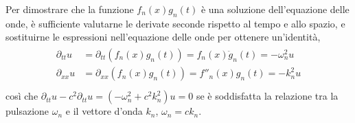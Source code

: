 \documentclass[letterpaper,10pt,italian]{jupyterBook}
\begin{document}
\sphinxAtStartPar
Per dimostrare che la funzione \(f_n(x) g_n(t)\) è una soluzione dell’equazione delle onde, è sufficiente valutarne le derivate seconde rispetto al tempo e allo spazio, e sostituirne le espressioni nell’equazione delle onde per ottenere un’identità,
\begin{equation*}
\begin{split}\begin{aligned}
  \partial_{tt} u & = \partial_{tt} \left( f_n(x) g_n(t) \right) = f_n(x) \ddot{g}_n(t) = - \omega_n^2 u \\
  \partial_{xx} u & = \partial_{xx} \left( f_n(x) g_n(t) \right) = f''_n(x) g_n(t) = - k_n^2 u \\
\end{aligned}\end{split}
\end{equation*}
\sphinxAtStartPar
così che \(\partial_{tt} u - c^2 \partial_{tt} u = \left( -\omega_n^2 + c^2 k_n^2 \right) u = 0\) se è soddisfatta la relazione tra la pulsazione \(\omega_n\) e il vettore d’onda \(k_n\), \(\omega_n = c k_n\).
\end{document}
